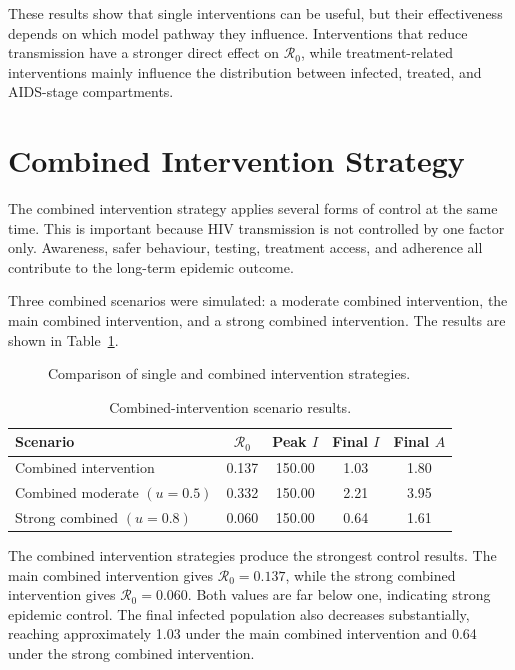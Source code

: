 \documentclass[12pt,a4paper,oneside]{report}
\begin{document}
These results show that single interventions can be useful, but their effectiveness depends on which model pathway they influence. Interventions that reduce transmission have a stronger direct effect on $\mathcal{R}_0$, while treatment-related interventions mainly influence the distribution between infected, treated, and AIDS-stage compartments.

\section{Combined Intervention Strategy}
The combined intervention strategy applies several forms of control at the same time. This is important because HIV transmission is not controlled by one factor only. Awareness, safer behaviour, testing, treatment access, and adherence all contribute to the long-term epidemic outcome.

Three combined scenarios were simulated: a moderate combined intervention, the main combined intervention, and a strong combined intervention. The results are shown in Table~\ref{tab:combined_interventions}.

\begin{figure}[H]
\centering
{}
\caption{Comparison of single and combined intervention strategies.}
\label{fig:combined_intervention}
\end{figure}

\begin{table}[H]
\centering
\caption{Combined-intervention scenario results.}
\label{tab:combined_interventions}
\begin{tabular}{lcccc}
\toprule
Scenario & $\mathcal{R}_0$ & Peak $I$ & Final $I$ & Final $A$\\
\midrule
Combined intervention & 0.137 & 150.00 & 1.03 & 1.80\\
Combined moderate $(u=0.5)$ & 0.332 & 150.00 & 2.21 & 3.95\\
Strong combined $(u=0.8)$ & 0.060 & 150.00 & 0.64 & 1.61\\
\bottomrule
\end{tabular}
\end{table}

The combined intervention strategies produce the strongest control results. The main combined intervention gives $\mathcal{R}_0=0.137$, while the strong combined intervention gives $\mathcal{R}_0=0.060$. Both values are far below one, indicating strong epidemic control. The final infected population also decreases substantially, reaching approximately 1.03 under the main combined intervention and 0.64 under the strong combined intervention.
\end{document}
